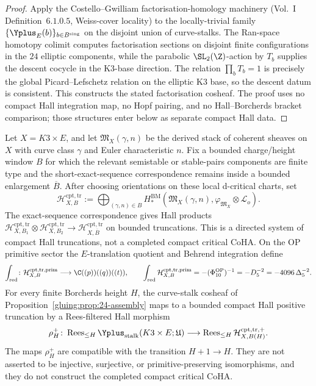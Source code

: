 \begin{proof}
Apply the Costello--Gwilliam factorisation-homology machinery
(Vol.~I Definition~$6.1.0.5$, Weiss-cover locality) to the
locally-trivial family $\{\Yplus_E(b)\}_{b\in B^{\mathrm{sing}}}$ on
the disjoint union of curve-stalks. The Ran-space homotopy colimit
computes factorisation sections on disjoint finite configurations in
the $24$ elliptic components, while the parabolic $\SL_2(\Z)$-action
by $T_b$ supplies the descent cocycle in the K3-base direction. The
relation $\prod_b T_b=1$ is precisely the global Picard--Lefschetz
relation on the elliptic K3 base, so the descent datum is consistent.
This constructs the stated factorisation cosheaf. The proof uses no
compact Hall integration map, no Hopf pairing, and no Hall--Borcherds
bracket comparison; those structures enter below as separate compact
Hall data.
\end{proof}

\begin{proposition}
\label{gluing:prop:compact-coha-rees-maps}
Let \(X=K3\times E\), and let
\(\mathfrak M_X(\gamma,n)\) be the derived stack of coherent sheaves
on \(X\) with curve class \(\gamma\) and Euler characteristic \(n\).
Fix a bounded charge/height window \(B\) for which the relevant
semistable or stable-pairs components are finite type and the
short-exact-sequence correspondence remains inside a bounded enlargement
\(\overline B\). After choosing orientations on these local
d-critical charts, set
\[
 \mathcal H_{X,B}^{\mathrm{cpt,tr}}
 :=
 \bigoplus_{(\gamma,n)\in B}
 H^{\mathrm{BM}}_*\!\left(
 \mathfrak M_X(\gamma,n),
 \varphi_{\mathfrak M_X}\otimes\mathscr L_o
 \right).
\]
The exact-sequence correspondence gives Hall products
\(\mathcal H_{X,B_1}^{\mathrm{cpt,tr}}\otimes
\mathcal H_{X,B_2}^{\mathrm{cpt,tr}}\to
\mathcal H_{X,\overline B}^{\mathrm{cpt,tr}}\) on bounded truncations.
This is a directed system of compact Hall truncations, not a completed
compact critical CoHA. On the OP primitive sector the \(E\)-translation
quotient and Behrend integration define
\[
 \int_{\mathrm{red}}\colon
 \mathcal H_{X,B}^{\mathrm{cpt,tr,prim}}
 \longrightarrow
 \C((p))((q))((t)),
 \qquad
 \int_{\mathrm{red}}\mathcal H_{X,B}^{\mathrm{cpt,tr,prim}}
 =
 -(\Phi_{10}^{\mathrm{OP}})^{-1}
 =
 -D_5^{-2}
 =
 -4096\,\Delta_5^{-2}.
\]
For every finite Borcherds height \(H\), the curve-stalk cosheaf of
Proposition~\ref{gluing:prop:24-assembly} maps to a bounded compact
Hall positive truncation by a Rees-filtered Hall morphism
\[
 \rho_H^+\colon
 \operatorname{Rees}_{\le H}
 \Yplus_{\mathrm{stalk}}(K3\times E;\mathfrak U)
 \longrightarrow
 \operatorname{Rees}_{\le H}
 \mathcal H_{X,B(H)}^{\mathrm{cpt,tr},+}.
\]
The maps \(\rho_H^+\) are compatible with the transition
\(H+1\to H\). They are not asserted to be injective, surjective, or
primitive-preserving isomorphisms, and they do not construct the
completed compact critical CoHA.
\end{proposition}

